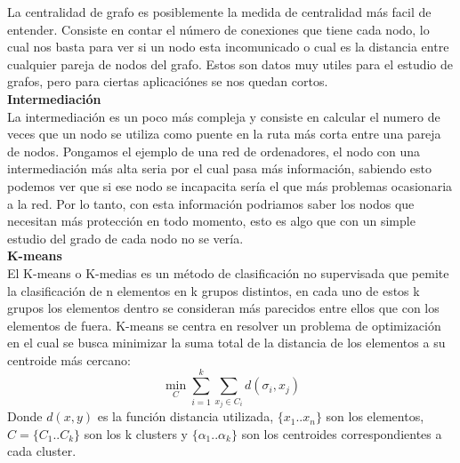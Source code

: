 \documentclass[12pt, letterpaper, twoside]{article}
\begin{document}
				La centralidad de grafo es posiblemente la medida de centralidad más facil de entender. Consiste en contar el número de conexiones que tiene cada nodo, lo cual nos basta para ver si un nodo esta incomunicado o cual es la distancia entre cualquier pareja de nodos del grafo. Estos son datos muy utiles para el estudio de grafos, pero para ciertas aplicaciónes se nos quedan cortos.\\ 
			{\textbf{Intermediación}}\\
				La intermediación es un poco más compleja y consiste en calcular el numero de veces que un nodo se utiliza como puente en la ruta más corta entre una pareja de nodos. Pongamos el ejemplo de una red de ordenadores, el nodo con una intermediación más alta seria por el cual pasa más información, sabiendo esto podemos ver que si ese nodo se incapacita sería el que más problemas ocasionaria a la red. Por lo tanto, con esta información podriamos saber los nodos que necesitan más protección en todo momento, esto es algo que con un simple estudio del grado de cada nodo no se vería.\\

		{\textbf{K-means}}\\
		El K-means o K-medias es un método de clasificación no supervisada que pemite la clasificación de n elementos en k grupos distintos, en cada uno de estos k grupos los elementos dentro se consideran más parecidos entre ellos que con los elementos de fuera. K-means se centra en resolver un problema de optimización en el cual se busca minimizar la suma total de la distancia de los elementos a su centroide más cercano:
		\[\min_{C} \sum_{i=1}^{k}\sum_{x_{j}\in C_{i}} d(\sigma_i , x_{j})\]
		Donde $d(x,y)$ es la función distancia utilizada,  $\{x_1..x_n\}$ son los elementos, $C=\{C_1..C_k\}$ son los k clusters y $\{\alpha_1..\alpha_k\}$  son los centroides correspondientes a cada cluster.
\end{document}
